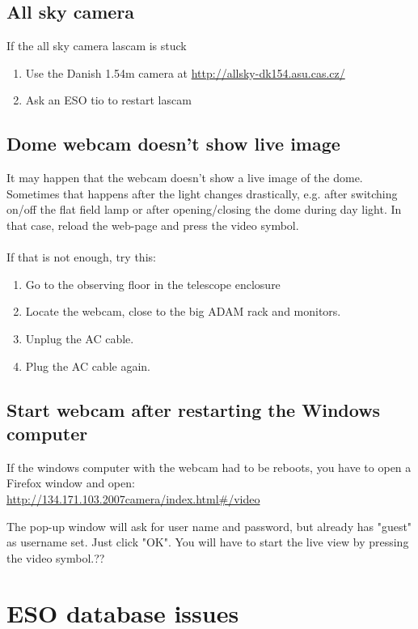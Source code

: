 \documentclass[11pt,fleqn,a4paper]{book}
\begin{document}
\subsection{All sky camera}
If the all sky camera \gls{lascam} is stuck
\begin{enumerate}
  \item Use the Danish 1.54m camera at \url{http://allsky-dk154.asu.cas.cz/}
  \item Ask an ESO \gls{tio} to restart \gls{lascam}
\end{enumerate}

\subsection{Dome webcam doesn't show live image}
It may happen that the \gls{webcam} doesn't show a live image of the dome. Sometimes that happens after the light changes drastically, e.g. after  switching on/off the flat field lamp or after opening/closing the dome during day light. In that case, reload the web-page and press the video symbol. \\
\\
If that is not enough, try this:
\begin{enumerate}
   \item Go to the observing floor in the telescope enclosure
   \item Locate the webcam, close to the big ADAM rack and monitors.
   \item Unplug the AC cable.
   \item Plug the AC cable again.
\end{enumerate}

\subsection{Start webcam after restarting the Windows computer}
If the windows computer with the webcam had to be reboots, you have to open a Firefox window and open:\\
\url{http://134.171.103.2007camera/index.html#/video}

The pop-up window will ask for user name and password, but already has "guest" as username set. Just click "OK". You will have to start the live view by pressing the video symbol.??


\section{ESO database issues}
\end{document}
